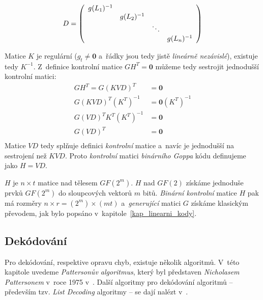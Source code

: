 \documentclass[thesis=M,czech,hidelinks]{FITthesis}[2012/06/26]
\newcommand{\0}{{\textcolor[gray]{0.75}{0}}}
\begin{document}
$$
    D = \left(\begin{array}{c c c c}
        g(L_1)^{-1} &             &        &             \\
                    & g(L_2)^{-1} &        &             \\
                    &             & \ddots &             \\
                    &             &        & g(L_n)^{-1} \\
    \end{array}\right)
$$

Matice $K$ je regulární ($g_t \neq \mathbf{0}$ a~řádky jsou tedy jistě
\emph{lineárně nezávislé}), existuje tedy $K^{-1}$. Z~definice kontrolní matice
$GH^T = \mathbf{0}$ můžeme tedy sestrojit jednodušší kontrolní matici:
\begin{align*}
    G H^T = G (KVD)^T                   &= \mathbf{0} \\
    G (KVD)^T\left(K^T\right)^{-1}      &= \mathbf{0} \left(K^T\right)^{-1} \\
    G (VD)^T K^T \left(K^T\right)^{-1}  &= \mathbf{0} \\
    G (VD)^T                            &= \mathbf{0} \\
\end{align*}
Matice $VD$ tedy splňuje definici \emph{kontrolní} matice a~navíc je jednodušší
na sestrojení než $KVD$. Proto \emph{kontrolní} matici \emph{binárního Goppa}
kódu definujeme jako $H=VD$.

$H$ je $n \times t$ matice nad tělesem $GF(2^m)$. $H$ nad $GF(2)$ získáme
jednoduše  prvků $GF(2^m)$ do sloupcových vektorů $m$ bitů.
\emph{Binární kontrolní} matice $H$ pak má rozměry $n \times r =
(2^m) \times (mt)$ a~\emph{generující} matici $G$ získáme klasickým převodem,
jak bylo popsáno v~kapitole~\ref{kap_linearni_kody}.


\subsection{Dekódování}\label{kap_goppa_dekodovani}

Pro dekódování, respektive opravu chyb, existuje několik algoritmů. V~této
kapitole uvedeme \emph{Pattersonův algoritmus}, který byl představen \emph{Nicholasem
Pattersonem} v~roce 1975 v~\cite{Patterson}. Další algoritmy pro dekódování
algoritmů -- především tzv. \emph{List Decoding} algoritmy -- se dají nalézt
v~\cite{Repka,Bernstein2}.
\end{document}
